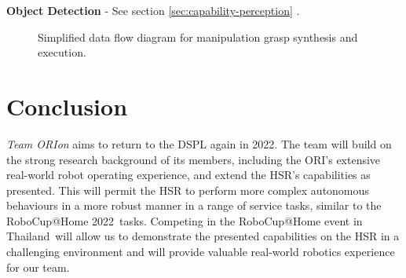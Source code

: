 \documentclass[runningheads,a4paper]{llncs}
\newcommand{\robospecs}{%
  \newpage%
  \pagenumbering{gobble}%
}
\newcommand{\teamori}{Team ORIon}
\newcommand{\competitionyear}{2022}
\newcommand{\competitioncountry}{Thailand}
\begin{document}
\textbf{Object Detection} - See section \ref{sec:capability-perception} . 

\begin{figure}[!t]
	\centering
	\vspace{-10pt}%
	\caption{Simplified data flow diagram for manipulation grasp synthesis and execution.}
	\label{fig:manipulation_data_flow}
	\vspace{-3ex}
\end{figure}


\section{Conclusion}
\textit{\teamori{}} aims to return to the DSPL again in \competitionyear. The team will build on the strong research background of its members, including the ORI's extensive real-world robot operating experience, and extend the HSR's capabilities as presented. This will permit the HSR to perform more complex autonomous behaviours in a more robust manner in a range of service tasks, similar to the RoboCup@Home \competitionyear\ tasks. 
Competing in the RoboCup@Home event in \competitioncountry\ will allow us to demonstrate the presented capabilities on the HSR in a challenging environment and will provide valuable real-world robotics experience for our team.





\robospecs

\end{document}
